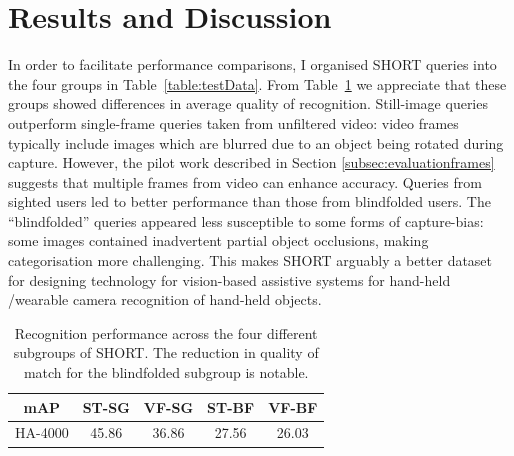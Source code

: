 \section{Results and Discussion} \label{sec:analysis} \label{sec:results}


In order to facilitate performance comparisons, I organised SHORT queries into the four groups in Table~\ref{table:testData}. From Table~\ref{table:sightedVSblindfolded} we appreciate that these groups showed differences in average quality of recognition. Still-image queries outperform single-frame queries taken from unfiltered video: video frames typically include images which are blurred due to an object being rotated during capture. However, the pilot work described in Section \ref{subsec:evaluationframes} suggests that multiple frames from video can enhance accuracy. Queries from sighted users led to better performance than those from blindfolded users. The ``blindfolded'' queries appeared less susceptible to some forms of  capture-bias: some images contained inadvertent partial object occlusions, making categorisation more challenging. This makes SHORT arguably a better dataset for designing technology for vision-based assistive systems for hand-held /wearable camera recognition of hand-held objects.


\begin{table}[]
\centering
  \begin{tabular}{ccccc}
   \toprule
    mAP & ST-SG & VF-SG & ST-BF & VF-BF \\
	\midrule
    HA-4000                    & 45.86    & 36.86   & 27.56 & 26.03\\
	\bottomrule
    \end{tabular}
    \caption{Recognition performance across the four different subgroups of SHORT. The reduction in quality of match for the blindfolded subgroup is notable.}
    \label{table:sightedVSblindfolded}
\end{table}


